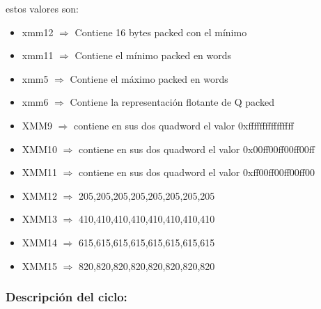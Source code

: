 estos valores son:
\begin{itemize}
  \item xmm12 $\Rightarrow$ Contiene 16 bytes packed con el mínimo
  \item xmm11 $\Rightarrow$ Contiene el mínimo packed en words
  \item xmm5 $\Rightarrow$ Contiene el máximo packed en words
  \item xmm6 $\Rightarrow$ Contiene la representación flotante de Q packed
  	\item XMM9 $\Rightarrow$ contiene en sus dos quadword el valor 0xffffffffffffffff
	\item XMM10 $\Rightarrow$ contiene en sus dos quadword el valor 0x00ff00ff00ff00ff
	\item XMM11 $\Rightarrow$ contiene en sus dos quadword el valor 0xff00ff00ff00ff00
	\item XMM12 $\Rightarrow$ 205,205,205,205,205,205,205,205
	\item XMM13 $\Rightarrow$ 410,410,410,410,410,410,410,410
	\item XMM14 $\Rightarrow$ 615,615,615,615,615,615,615,615
	\item XMM15 $\Rightarrow$ 820,820,820,820,820,820,820,820 
\end{itemize}

\subsubsection{Descripción del ciclo:}

